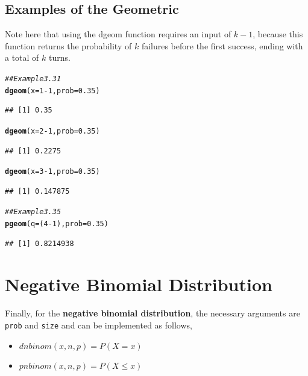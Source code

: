 \documentclass{report}\usepackage[]{graphicx}\usepackage[]{color}
\makeatletter
\newcommand{\hlnum}[1]{\textcolor[rgb]{0.686,0.059,0.569}{#1}}%
\newcommand{\hlcom}[1]{\textcolor[rgb]{0.678,0.584,0.686}{\textit{#1}}}%
\newcommand{\hlopt}[1]{\textcolor[rgb]{0,0,0}{#1}}%
\newcommand{\hlstd}[1]{\textcolor[rgb]{0.345,0.345,0.345}{#1}}%
\newcommand{\hlkwc}[1]{\textcolor[rgb]{0.333,0.667,0.333}{#1}}%
\newcommand{\hlkwd}[1]{\textcolor[rgb]{0.737,0.353,0.396}{\textbf{#1}}}%
\newenvironment{kframe}{%
 \def\at@end@of@kframe{}%
 \ifinner\ifhmode%
  \def\at@end@of@kframe{\end{minipage}}%
  \begin{minipage}{\columnwidth}%
 \fi\fi%
 \def\FrameCommand##1{\hskip\@totalleftmargin \hskip-\fboxsep
 \colorbox{shadecolor}{##1}\hskip-\fboxsep
     \hskip-\linewidth \hskip-\@totalleftmargin \hskip\columnwidth}%
 \MakeFramed {\advance\hsize-\width
   \@totalleftmargin\z@ \linewidth\hsize
   \@setminipage}}%
 {\par\unskip\endMakeFramed%
 \at@end@of@kframe}
\newenvironment{knitrout}{}{} %
\makeatother
\begin{document}
\subsection{Examples of the Geometric}
Note here that using the dgeom function requires an input of $k-1$, because this function returns the probability of $k$ failures before the first success, ending with a total of $k$ turns.  
\begin{knitrout}
\color{fgcolor}\begin{kframe}
\begin{alltt}
\hlcom{## Example 3.31}
\hlkwd{dgeom}\hlstd{(}\hlkwc{x} \hlstd{=} \hlnum{1}\hlopt{-}\hlnum{1}\hlstd{,} \hlkwc{prob} \hlstd{=} \hlnum{0.35}\hlstd{)}
\end{alltt}
\begin{verbatim}
## [1] 0.35
\end{verbatim}
\begin{alltt}
\hlkwd{dgeom}\hlstd{(}\hlkwc{x} \hlstd{=} \hlnum{2}\hlopt{-}\hlnum{1}\hlstd{,} \hlkwc{prob} \hlstd{=} \hlnum{0.35}\hlstd{)}
\end{alltt}
\begin{verbatim}
## [1] 0.2275
\end{verbatim}
\begin{alltt}
\hlkwd{dgeom}\hlstd{(}\hlkwc{x} \hlstd{=} \hlnum{3}\hlopt{-}\hlnum{1}\hlstd{,} \hlkwc{prob} \hlstd{=} \hlnum{0.35}\hlstd{)}
\end{alltt}
\begin{verbatim}
## [1] 0.147875
\end{verbatim}
\end{kframe}
\end{knitrout}

\begin{knitrout}
\color{fgcolor}\begin{kframe}
\begin{alltt}
\hlcom{## Example 3.35}
\hlkwd{pgeom}\hlstd{(}\hlkwc{q} \hlstd{= (}\hlnum{4}\hlopt{-}\hlnum{1}\hlstd{),} \hlkwc{prob} \hlstd{=} \hlnum{0.35}\hlstd{)}
\end{alltt}
\begin{verbatim}
## [1] 0.8214938
\end{verbatim}
\end{kframe}
\end{knitrout}

\section{Negative Binomial Distribution}
Finally, for the \textbf{negative binomial distribution}, the necessary arguments are \texttt{prob} and \texttt{size} and can be implemented as follows, 
\begin{itemize} 
\item $dnbinom(x,n,p) = P(X = x)$ 
\item $pnbinom(x,n,p) = P(X \leq x)$ 
\end{itemize}
\end{document}
